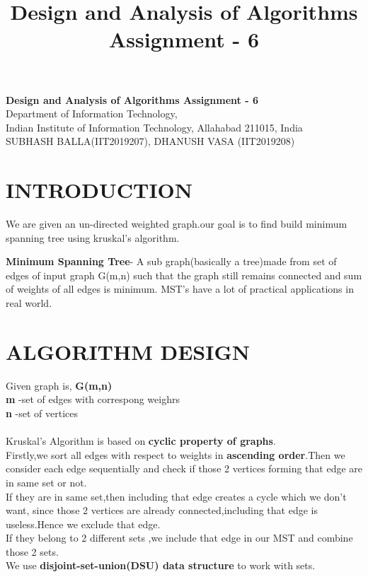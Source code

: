 \documentclass[10pt]{article}
\author{}
\title{\Large{Design and Analysis of Algorithms Assignment - 6}}
\begin{document}
	\begin{center}
		{\Large \textbf{Design and Analysis of Algorithms Assignment - 6}}\\
		\vspace{1em}
		{\large Department of Information Technology,}\\
		\vspace{1em}
		\large{Indian Institute of Information Technology, Allahabad 211015, India}\\
		\vspace{1em}
		\large{SUBHASH BALLA(IIT2019207), DHANUSH VASA (IIT2019208)}
		\vspace{2.5em}

	\end{center}



\section*{INTRODUCTION}

We are given  an un-directed weighted graph.our goal is to find build  minimum spanning tree using kruskal's algorithm.

\textbf{Minimum Spanning Tree}- A sub graph(basically a tree)made from set of edges of input graph G(m,n) such that the graph still remains connected and sum of weights of all edges is minimum.
MST's have a lot of  practical applications in real world.


\section*{ALGORITHM DESIGN}

Given graph is, \textbf{G(m,n)}\\
\textbf{m} -set of edges with correspong weighrs\\
\textbf{n} -set of vertices\\\\
Kruskal's Algorithm is based on \textbf{cyclic property of graphs}.\\
Firstly,we sort all edges with respect to weights in \textbf{ascending order}.Then we consider each edge sequentially and check if those 2 vertices forming that edge are in same set or not.\\
If they are in same set,then including that edge creates a cycle which we don't want, since  those 2 vertices are already connected,including that edge is useless.Hence we exclude that edge.\\
If they belong to 2 different sets ,we include that edge in our MST and combine those 2 sets.\\
We use\textbf{ disjoint-set-union(DSU) data structure} to work with sets.
\end{document}
